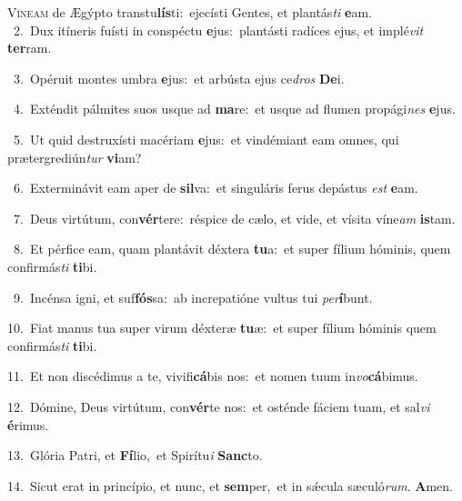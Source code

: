 \lettrine{\initial\textcolor{\initialcolor}{V}}{íneam} de Ægýpto transtu\-\textbf{lís}\-ti:~\star ejecísti Gentes, et plantás\textit{ti} \textbf{e}\-am.\\
{\numbfont\textcolor{\numbcolor}{~2.}}~Dux itíneris fuísti in conspéctu \textbf{e}\-jus:~\star plantásti radíces ejus, et implé\textit{vit} \textbf{ter}\-ram.\par
{\numbfont\textcolor{\numbcolor}{~3.}}~Opéruit montes umbra \textbf{e}\-jus:~\star et arbústa ejus ce\textit{dros} \textbf{De}\-i.\par
{\numbfont\textcolor{\numbcolor}{~4.}}~Exténdit pálmites suos usque ad \textbf{ma}\-re:~\star et usque ad flumen propági\textit{nes} \textbf{e}\-jus.\par
{\numbfont\textcolor{\numbcolor}{~5.}}~Ut quid destruxísti macériam \textbf{e}\-jus:~\star et vindémiant eam omnes, qui prætergrediún\textit{tur} \textbf{vi}\-am?\par
{\numbfont\textcolor{\numbcolor}{~6.}}~Exterminávit eam aper de \textbf{sil}\-va:~\star et singuláris ferus depástus \textit{est} \textbf{e}\-am.\par
{\numbfont\textcolor{\numbcolor}{~7.}}~Deus virtútum, con\-\textbf{vér}\-tere:~\star réspice de cælo, et vide, et vísita víne\textit{am} \textbf{is}\-tam.\par
{\numbfont\textcolor{\numbcolor}{~8.}}~Et pérfice eam, quam plantávit déxtera \textbf{tu}\-a:~\star et super fílium hóminis, quem confirmás\textit{ti} \textbf{ti}\-bi.\par
{\numbfont\textcolor{\numbcolor}{~9.}}~Incénsa igni, et suf\-\textbf{fós}\-sa:~\star ab increpatióne vultus tui \textit{per}\-\textbf{í}bunt.\par
{\numbfont\textcolor{\numbcolor}{10.}}~Fiat manus tua super virum déxteræ \textbf{tu}\-æ:~\star et super fílium hóminis quem confirmás\textit{ti} \textbf{ti}\-bi.\par
{\numbfont\textcolor{\numbcolor}{11.}}~Et non discédimus a te, vivifi\-\textbf{cá}\-bis nos:~\star et nomen tuum in\-\textit{vo}\-\textbf{cá}bimus.\par
{\numbfont\textcolor{\numbcolor}{12.}}~Dómine, Deus virtútum, con\-\textbf{vér}\-te nos:~\star et osténde fáciem tuam, et sal\textit{vi} \textbf{é}\-rimus.\par
{\numbfont\textcolor{\numbcolor}{13.}}~Glória Patri, et \textbf{Fí}\-lio,~\star et Spirítu\textit{i} \textbf{Sanc}\-to.\par
{\numbfont\textcolor{\numbcolor}{14.}}~Sicut erat in princípio, et nunc, et \textbf{sem}\-per,~\star et in sǽcula sæculó\-\textit{rum}\-. \textbf{A}\-men.\par
